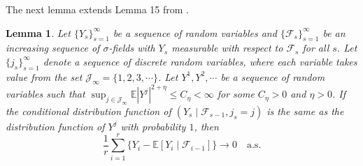 \documentclass[12pt]{article}
\newtheorem{lemma}[theorem]{Lemma}
\begin{document}
The next lemma extends Lemma 15 from .

\begin{lemma} \label{lemma:lemma4}
Let $\{Y_s\}_{s=1}^{\infty}$ be a sequence of random variables and $\{\mathcal{F}_{s}\}_{s=1}^{\infty}$ be an increasing sequence of $\sigma$-fields with $Y_s$ measurable with respect to $\mathcal{F}_s$ for all $s$. Let $\{j_s\}_{s=1}^{\infty}$ denote a sequence of discrete random variables, where each variable takes value from the set $\mathcal{J}_{\infty} = \{1,2,3, \cdots \}$. Let $Y^1,Y^2, \cdots$ be a sequence of random variables such that $\sup_{j \in \mathcal{J}_{\infty}} \mathbb{E}|Y^j|^{2 + \eta} \le C_{\eta} <\infty$ for some $C_{\eta} > 0$ and $\eta > 0$. If the conditional distribution function of $(Y_s \mid \mathcal{F}_{s-1}, j_s = j)$ is the same as the distribution function of $Y^j$ with probability $1$, then
\begin{equation*}
\frac{1}{r} \sum_{i=1}^{r} \Big\{ Y_{i} - \mathbb{E}[Y_i \mid \mathcal{F}_{i-1}] \Big\} \to 0 \quad \text{a.s}.
\end{equation*}
\end{lemma}
\end{document}
